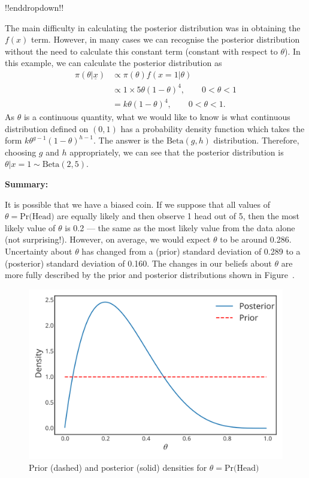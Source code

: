 {!!enddropdown!!











The main difficulty in calculating the posterior distribution was in obtaining the $f(x)$ term. However, in many cases we can recognise the posterior distribution without the need to calculate this constant term (constant with respect to $\theta$). In this example, we can calculate the posterior distribution as
\begin{align*}
\pi(\theta|\underline{x})&\propto\pi(\theta)f(x=1|\theta) \\
&\propto 1\times 5\theta(1-\theta)^4,\quad\quad 0<\theta<1  \\
&=k\theta(1-\theta)^4,\quad\quad 0<\theta<1.
\end{align*}
As $\theta$ is a continuous quantity, what we would like to know is what continuous distribution defined on $(0,1)$ has a probability density function which takes the form $k\theta^{g-1}(1-\theta)^{h-1}$. The answer is the $\mathrm{Beta}(g,h)$ distribution. Therefore, choosing $g$ and $h$ appropriately, we can see that the posterior distribution is $\theta|x=1\sim \mathrm{Beta}(2,5)$.

\textbf{Summary:}

It is possible that we have a biased coin. If we suppose that all values of $\theta=\text{Pr(Head)}$ are equally likely and then observe 1 head out of 5, then the most likely value of $\theta$ is 0.2 --- the same as the most likely value from the data alone (not surprising!). However, on average, we would expect $\theta$ to be around 0.286. Uncertainty about $\theta$ has changed from a (prior) standard deviation of 0.289 to a (posterior) standard deviation of 0.160. The changes in our beliefs about $\theta$ are more fully described by the prior and posterior distributions shown in Figure~.
\begin{figure}[ht]

\includegraphics{images/priorplot1.svg}
\caption{Prior (dashed) and posterior (solid) densities for $\theta=\text{Pr(Head)}$}
\label{fig:betaplot2}

\end{figure}}

